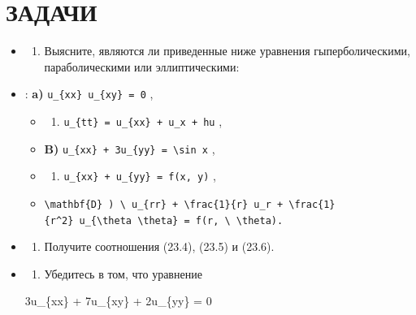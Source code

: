 \documentclass[
  ukrainian,
]{article}
\providecommand{\tightlist}{%
  \setlength{\itemsep}{0pt}\setlength{\parskip}{0pt}}
\begin{document}
\section{ЗАДАЧИ}\label{ux437ux430ux434ux430ux447ux438-3}

\begin{itemize}
\item
  \begin{enumerate}
  \def\labelenumi{\arabic{enumi}.}
  \tightlist
  \item
    Выясните, являются ли приведенные ниже уравнения гыперболическими,
    параболическими или эллиптическими:
  \end{enumerate}
\item
  : \textbf{a)} \texttt{u\_\{xx\}\ u\_\{xy\}\ =\ 0} ,

  \begin{itemize}
  \tightlist
  \item
    \begin{enumerate}
    \def\labelenumi{\arabic{enumi})}
    \setcounter{enumi}{5}
    \tightlist
    \item
      \texttt{u\_\{tt\}\ =\ u\_\{xx\}\ +\ u\_x\ +\ hu} ,
    \end{enumerate}
  \item
    \textbf{B)}
    \texttt{u\_\{xx\}\ +\ 3u\_\{yy\}\ =\ \textbackslash{}sin\ x} ,
  \item
    \begin{enumerate}
    \def\labelenumi{\alph{enumi})}
    \setcounter{enumi}{17}
    \tightlist
    \item
      \texttt{u\_\{xx\}\ +\ u\_\{yy\}\ =\ f(x,\ y)} ,
    \end{enumerate}
  \item
    \texttt{\textbackslash{}mathbf\{D\}\ )\ \textbackslash{}\ u\_\{rr\}\ +\ \textbackslash{}frac\{1\}\{r\}\ u\_r\ +\ \textbackslash{}frac\{1\}\{r\^{}2\}\ u\_\{\textbackslash{}theta\ \textbackslash{}theta\}\ =\ f(r,\ \textbackslash{}\ \textbackslash{}theta).}
  \end{itemize}
\item
  \begin{enumerate}
  \def\labelenumi{\arabic{enumi}.}
  \setcounter{enumi}{1}
  \tightlist
  \item
    Получите соотношения (23.4), (23.5) и (23.6).
  \end{enumerate}
\item
  \begin{enumerate}
  \def\labelenumi{\arabic{enumi}.}
  \setcounter{enumi}{2}
  \tightlist
  \item
    Убедитесь в том, что уравнение
  \end{enumerate}

  3u\_\{xx\} + 7u\_\{xy\} + 2u\_\{yy\} = 0
\end{itemize}
\end{document}
